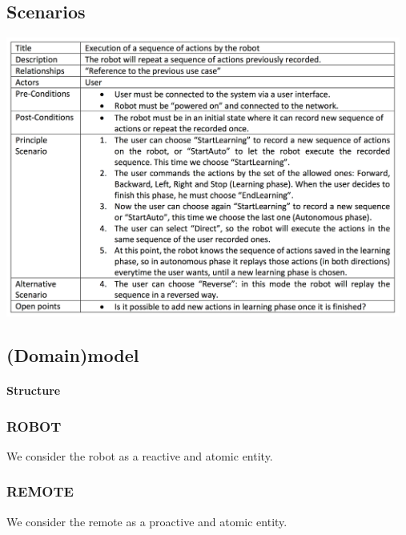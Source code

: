 \documentclass{llncs}
\newcommand{\labelssec}[1]{\label{ssec:#1}}
\begin{document}
\subsection{Scenarios}
\labelssec{Scenarios}
\begin{center}
   	\includegraphics[width=13cm]{img/scenario.png}\\
\end{center}
\subsection{(Domain)model}
\labelssec{(Domain)model}
\paragraph{Structure}
\subsubsection{ROBOT}
We consider the robot as a reactive and atomic entity.
\subsubsection{REMOTE}
We consider the remote as a proactive and atomic entity.
\end{document}
